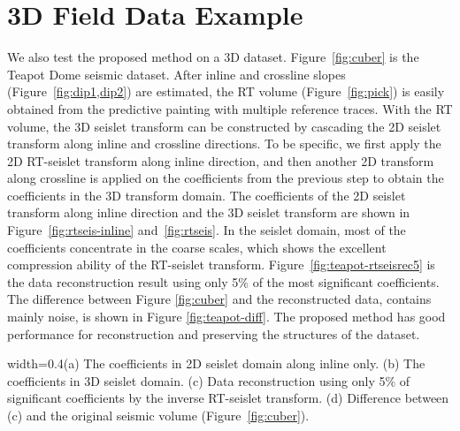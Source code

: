 \section{3D Field Data Example}
    We also test the proposed method on a 3D dataset. 
    Figure~\ref{fig:cuber} is the Teapot Dome seismic dataset. 
    After inline and crossline slopes (Figure~\ref{fig:dip1,dip2}) are 
    estimated, the RT volume (Figure~\ref{fig:pick}) is easily obtained from the 
    predictive painting with multiple reference traces. 
    With the RT volume, the 3D seislet transform can be constructed by 
    cascading the 2D seislet transform along inline and crossline directions. 
    To be specific, we first apply the 2D RT-seislet transform along inline 
    direction, and then another 2D transform along crossline is applied on the 
    coefficients from the previous step to obtain the coefficients in the 3D 
    transform domain.
    The coefficients of the 2D seislet transform along inline direction and the 
    3D seislet transform are shown in Figure~\ref{fig:rtseis-inline} 
    and~\ref{fig:rtseis}.
    In the seislet domain, most of the coefficients concentrate in the coarse 
    scales, which shows the excellent compression ability of the RT-seislet 
    transform. 
    Figure~\ref{fig:teapot-rtseisrec5} is the data reconstruction result using 
    only 5\% of the most significant coefficients. 
    The difference between Figure \ref{fig:cuber} and the reconstructed data, 
    contains mainly noise, is shown in Figure \ref{fig:teapot-diff}.
    The proposed method has good performance for reconstruction and preserving 
    the structures of the dataset.

    {width=0.4\columnwidth}{(a) The coefficients in 2D seislet domain along 
    inline only. (b) The coefficients in 3D seislet domain. (c) Data 
    reconstruction using only 5\% of significant coefficients by the inverse 
    RT-seislet transform. (d) Difference between (c) and the original seismic 
    volume (Figure~\ref{fig:cuber}).}

